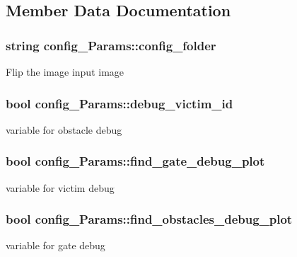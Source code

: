 \subsection{Member Data Documentation}
\subsubsection[{\texorpdfstring{config\+\_\+folder}{config_folder}}]{\setlength{\rightskip}{0pt plus 5cm}string config\+\_\+\+Params\+::config\+\_\+folder}\hypertarget{classconfig__Params_a7a97ddbf1ad5e453973c74599d6ba008}{}\label{classconfig__Params_a7a97ddbf1ad5e453973c74599d6ba008}
Flip the image input image 
\subsubsection[{\texorpdfstring{debug\+\_\+victim\+\_\+id}{debug_victim_id}}]{\setlength{\rightskip}{0pt plus 5cm}bool config\+\_\+\+Params\+::debug\+\_\+victim\+\_\+id}\hypertarget{classconfig__Params_ad05db8c647135b2b9c4315a98e007479}{}\label{classconfig__Params_ad05db8c647135b2b9c4315a98e007479}
variable for obstacle debug 
\subsubsection[{\texorpdfstring{find\+\_\+gate\+\_\+debug\+\_\+plot}{find_gate_debug_plot}}]{\setlength{\rightskip}{0pt plus 5cm}bool config\+\_\+\+Params\+::find\+\_\+gate\+\_\+debug\+\_\+plot}\hypertarget{classconfig__Params_ad4a4cb85eaf8e525489432353cc7efd5}{}\label{classconfig__Params_ad4a4cb85eaf8e525489432353cc7efd5}
variable for victim debug 
\subsubsection[{\texorpdfstring{find\+\_\+obstacles\+\_\+debug\+\_\+plot}{find_obstacles_debug_plot}}]{\setlength{\rightskip}{0pt plus 5cm}bool config\+\_\+\+Params\+::find\+\_\+obstacles\+\_\+debug\+\_\+plot}\hypertarget{classconfig__Params_a81fcbdd376e37ce57fa0172879f1b414}{}\label{classconfig__Params_a81fcbdd376e37ce57fa0172879f1b414}
variable for gate debug 
